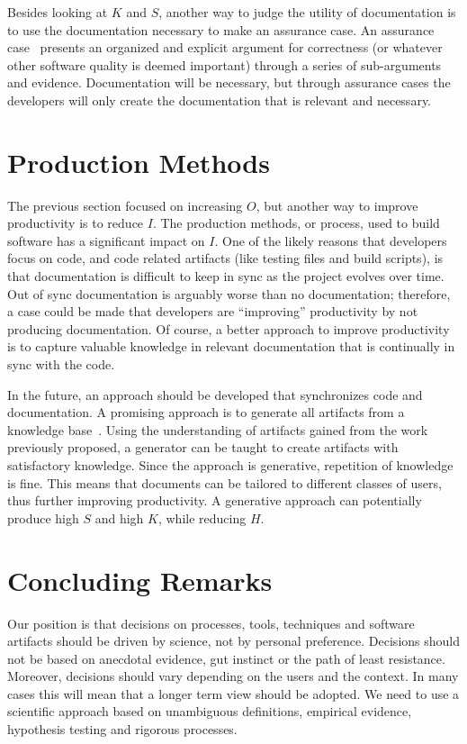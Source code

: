 \documentclass[sigconf, authorversion, nonacm]{acmart}
\begin{document}
Besides looking at $K$ and $S$, another way to judge the utility of
documentation is to use the documentation necessary to make an assurance case.
An assurance case~\cite{RinehartEtAl2015} presents an organized and explicit
argument for correctness (or whatever other software quality is deemed
important) through a series of sub-arguments and evidence.  Documentation will
be necessary, but through assurance cases the developers will only create the
documentation that is relevant and necessary. %

\section{Production Methods}

The previous section focused on increasing $O$, but another way to improve
productivity is to reduce $I$.  The production methods, or process, used to
build software has a significant impact on $I$.  One of the likely reasons that
developers focus on code, and code related artifacts (like testing files and
build scripts), is that documentation is difficult to keep in sync as the
project evolves over time.  Out of sync documentation is arguably worse than no
documentation; therefore, a case could be made that developers are ``improving''
productivity by not producing documentation.  Of course, a better approach to
improve productivity is to capture valuable knowledge in relevant documentation
that is continually in sync with the code.

In the future, an approach should be developed that synchronizes code and
documentation.  A promising approach is to generate all artifacts from a
knowledge base~\cite{SzymczakEtAl2016}.  Using the understanding of artifacts
gained from the work previously proposed, a generator can be taught to create
artifacts with satisfactory knowledge. Since the approach is generative,
repetition of knowledge is fine.  This means that documents can be tailored to
different classes of users, thus further improving productivity.  A generative
approach can potentially produce high $S$ and high $K$, while reducing $H$.

\section{Concluding Remarks}

Our position is that decisions on processes, tools, techniques and software
artifacts should be driven by science, not by personal preference.  Decisions
should not be based on anecdotal evidence, gut instinct or the path of least
resistance.  Moreover, decisions should vary depending on the users and the
context.  In many cases this will mean that a longer term view should be
adopted.  We need to use a scientific approach based on unambiguous definitions,
empirical evidence, hypothesis testing and rigorous processes.
\end{document}
